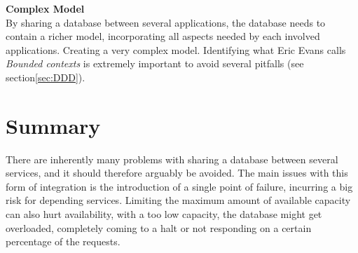 \textbf{Complex Model}\\
By sharing a database between several applications, the database needs to contain a richer model, incorporating all aspects needed by each involved applications. Creating a very complex model\cite[p.~6]{sadalage2012nosql}. Identifying what Eric Evans calls \textit{Bounded contexts} is extremely important to avoid several pitfalls (see section\ref{sec:DDD}).

\section{Summary}
There are inherently many problems with sharing a database between several services, and it should therefore arguably be avoided. The main issues with this form of integration is the introduction of a single point of failure, incurring a big risk for depending services. Limiting the maximum amount of available capacity can also hurt availability, with a too low capacity, the database might get overloaded, completely coming to a halt or not responding on a certain percentage of the requests.